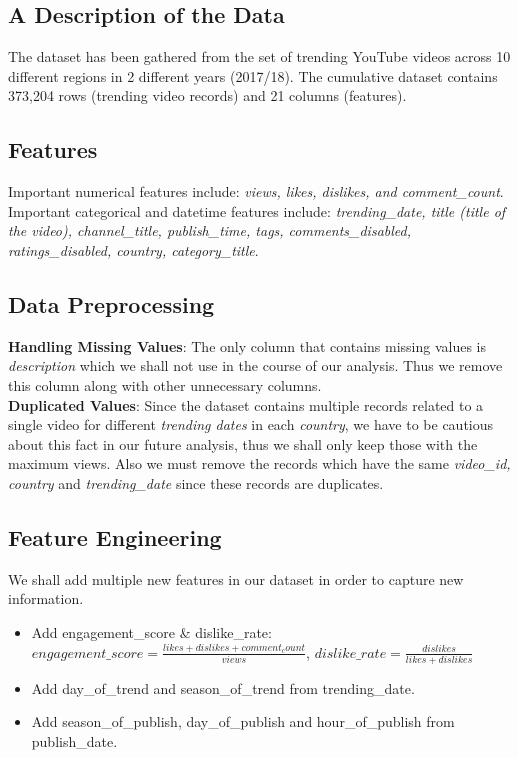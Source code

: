 \documentclass[a4paper,12pt]{article}
\begin{document}
\subsection*{A Description of the Data}
The dataset has been gathered from the set of trending YouTube videos across 10 different regions in 2 different years (2017/18). The cumulative dataset contains 373,204 rows (trending video records) and 21 columns (features).

\subsection*{Features}
Important numerical features include: \textit{views, likes, dislikes, and comment\_count}. Important categorical and datetime features include: \textit{trending\_date, title (title of the video), 
channel\_title, publish\_time, tags, comments\_disabled, ratings\_disabled, country, category\_title}.

\subsection*{Data Preprocessing}
\noindent \textbf{Handling Missing Values}: The only column that contains missing values is \textit{description} which we shall not use in the course of our analysis. Thus we remove this column along
with other unnecessary columns. \\ 

\noindent \textbf{Duplicated Values}: Since the dataset contains multiple records related to a single video for different \textit{trending dates} in each \textit{country}, we have to be cautious about this 
fact in our future analysis, thus we shall only keep those with the maximum views. Also we must remove the records which have the same \textit{video\_id, country} and \textit{trending\_date} since these records are duplicates. \\

\subsection*{Feature Engineering}
We shall add multiple new features in our dataset in order to capture new information.

\begin{itemize}
    \item Add engagement\_score \& dislike\_rate:
    \( engagement\_score = \frac{likes + dislikes + comment_count}{views} \), \( dislike\_rate = \frac{dislikes}{likes + dislikes} \)
    \item Add day\_of\_trend and season\_of\_trend from trending\_date.
    \item Add season\_of\_publish, day\_of\_publish and hour\_of\_publish from publish\_date.
\end{itemize}
\end{document}
